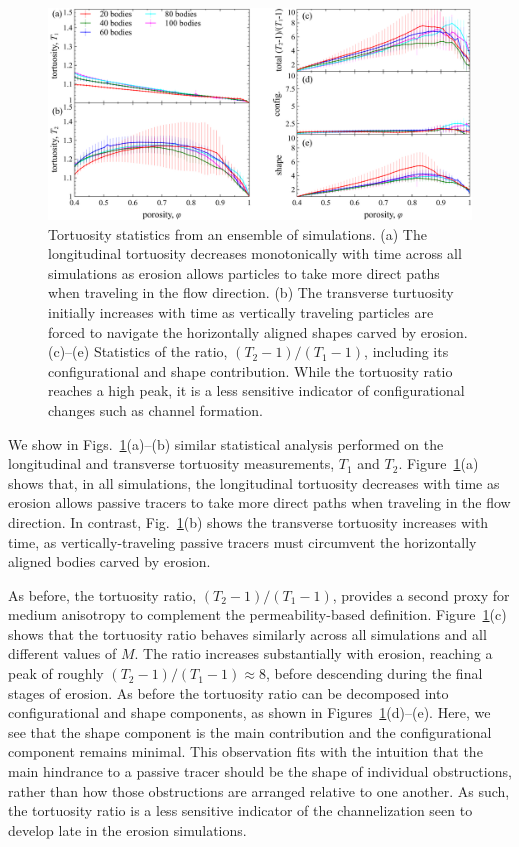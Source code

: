 \documentclass[3p]{elsarticle}
\begin{document}
\begin{figure}%
\centering
\includegraphics[width = 0.9 \textwidth]{./figs/fig6.pdf}
\caption{
Tortuosity statistics from an ensemble of simulations. (a) The longitudinal tortuosity decreases monotonically with time across all simulations as erosion allows particles to take more direct paths when traveling in the flow direction. (b) The transverse turtuosity initially increases with time as vertically traveling particles are forced to navigate the horizontally aligned shapes carved by erosion. (c)--(e) Statistics of the ratio, $(T_2 -1)/(T_1 -1)$, including its configurational and shape contribution. While the tortuosity ratio reaches a high peak, it is a less sensitive indicator of configurational changes such as channel formation.
\label{fig6}
}
\end{figure}

We show in Figs.~\ref{fig6}(a)--(b) similar statistical analysis performed on the longitudinal and transverse tortuosity measurements, $T_1$ and $T_2$. Figure~\ref{fig6}(a) shows that, in all simulations, the longitudinal tortuosity decreases with time as erosion allows passive tracers to take more direct paths when traveling in the flow direction. In contrast, Fig.~\ref{fig6}(b) shows the transverse tortuosity increases with time, as vertically-traveling passive tracers must circumvent the horizontally aligned bodies carved by erosion.

As before, the tortuosity ratio, $(T_2 -1)/(T_1 -1)$, provides a second proxy for medium anisotropy to complement the permeability-based definition. Figure~\ref{fig6}(c) shows that the tortuosity ratio behaves similarly across all simulations and all different values of $M$. The ratio increases substantially with erosion, reaching a peak of roughly $(T_2 -1)/(T_1 -1) \approx 8$, before descending during the final stages of erosion. As before the tortuosity ratio can be decomposed into configurational and shape components, as shown in Figures~\ref{fig6}(d)--(e). Here, we see that the shape component is the main contribution and the configurational component remains minimal. This observation fits with the intuition that the main hindrance to a passive tracer should be the shape of individual obstructions, rather than how those obstructions are arranged relative to one another. As such, the tortuosity ratio is a less sensitive indicator of the channelization seen to develop late in the erosion simulations.
\end{document}
